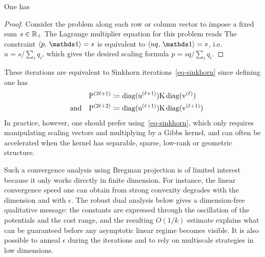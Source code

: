 \begin{prop}
One has
\end{prop}
\begin{proof}
	Consider the problem along each row or column vector to impose a fixed sum $s \in \mathbb{R}_+$
	The Lagrange multiplier equation for this problem reads
	The constraint $\dotp{p}{\ones} = s$ is equivalent to $\dotp{uq}{\ones}=s$, i.e. $u=s/\sum_i q_i$, which gives the desired scaling formula
	$p=s q/\sum_i q_i$.
\end{proof}

These iterations are equivalent to Sinkhorn iterations~\eqref{eq-sinkhorn} since defining
\eq{\label{eq-sink-matrix}\P^{(2\ell)} \eqdef \diag(\it{\uD}) \K \diag(\it{\vD}),}
one has
\begin{align*}
	\mathrm{P}^{(2\ell+1)} &\coloneqq \operatorname{diag}(\mathrm{u}^{(\ell+1)}) \mathrm{K} \operatorname{diag}(\mathrm{v}^{(\ell)}) \\
	\quad \text{and} \quad
	\mathrm{P}^{(2\ell+2)} &\coloneqq \operatorname{diag}(\mathrm{u}^{(\ell+1)}) \mathrm{K} \operatorname{diag}(\mathrm{v}^{(\ell+1)})
\end{align*}
In practice, however, one should prefer using~\eqref{eq-sinkhorn}, which only requires manipulating scaling vectors and multiplying by a Gibbs kernel, and can often be accelerated when the kernel has separable, sparse, low-rank or geometric structure.

Such a convergence analysis using Bregman projection is of limited interest because it only works directly in finite dimension. For instance, the linear convergence speed one can obtain from strong convexity degrades with the dimension and with $\epsilon$. The robust dual analysis below gives a dimension-free qualitative message: the constants are expressed through the oscillation of the potentials and the cost range, and the resulting $O(1/k)$ estimate explains what can be guaranteed before any asymptotic linear regime becomes visible.
%
It is also possible to anneal $\epsilon$ during the iterations and to rely on multiscale strategies in low dimensions.

